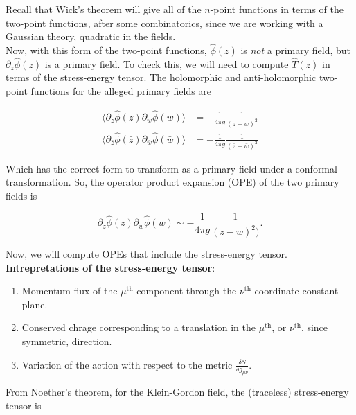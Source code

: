 \noindent Recall that Wick's theorem will give all of the $n$-point functions in terms of the two-point functions, after some combinatorics, since we are working with a Gaussian theory, quadratic in the fields. \\

\noindent Now, with this form of the two-point functions, $\hat{\phi} (z)$ is \textit{not} a primary field, but $\partial_z \hat{\phi} (z)$ is a primary field. To check this, we will need to compute $\hat{T} (z)$ in terms of the stress-energy tensor. The holomorphic and anti-holomorphic two-point functions for the alleged primary fields are

\begin{align}
\langle \partial_z \hat{\phi} (z) \partial_w \hat{\phi} (w) \rangle &= - \frac{1}{4 \pi g} \frac{1}{(z-w)^2} \\
\langle \partial_{\bar{z}} \hat{\phi} (\bar{z}) \partial_{\bar{w}} \hat{\phi} (\bar{w}) \rangle &= - \frac{1}{4 \pi g} \frac{1}{(\bar{z}-\bar{w})^2}
\end{align}

\noindent Which has the correct form to transform as a primary field under a conformal transformation. So, the operator product expansion (OPE) of the two primary fields is 

\begin{equation}
\partial_z \hat{\phi} (z) \partial_w \hat{\phi} (w) \sim - \frac{1}{4 \pi g} \frac{1}{(z-w)^2)}.
\end{equation}

\noindent Now, we will compute OPEs that include the stress-energy tensor. \\

\noindent \textbf{Intrepretations of the stress-energy tensor}: \\

\begin{enumerate}
\item Momentum flux of the $\mu^{\text{th}}$ component through the $\nu^{\text{th}}$ coordinate constant plane.
\item Conserved chrage corresponding to a translation in the $\mu^{\text{th}}$, or $\nu^{\text{th}}$, since symmetric, direction.
\item Variation of the action with respect to the metric $\frac{\delta S}{\delta g_{\mu\nu}}$.
\end{enumerate}

\noindent From Noether's theorem, for the Klein-Gordon field, the (traceless) stress-energy tensor is

